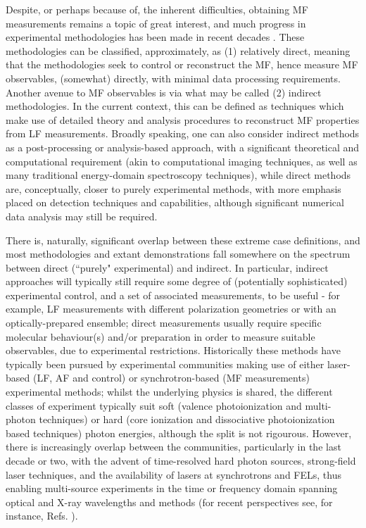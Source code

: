 \documentclass[10pt]{article}
\begin{document}
Despite, or perhaps because of, the inherent difficulties, obtaining  MF measurements remains a topic of great interest, and much progress in experimental methodologies has been made in recent decades \cite{Becker1998,Reid2003,Reid2012,kleinpoppen2013perfect,Yagishita2015,hockett2018QMP1}. %
These methodologies can be classified, approximately, as (1) relatively direct, meaning that the methodologies seek to control or reconstruct the MF, hence measure MF observables, (somewhat) directly, with minimal data processing requirements. Another avenue to MF observables is via what may be called (2) indirect methodologies. In the current context, this can be defined as techniques which make use of detailed theory and analysis procedures to reconstruct MF properties from LF measurements. Broadly speaking, one can also consider indirect methods as a post-processing or analysis-based approach, with a significant theoretical and computational requirement (akin to computational imaging techniques, as well as many traditional energy-domain spectroscopy techniques), while direct methods are, conceptually, closer to purely experimental methods, with more emphasis placed on detection techniques and capabilities, although significant numerical data analysis may still be required. 

There is, naturally, significant overlap between these extreme case definitions, and most methodologies and extant demonstrations fall somewhere on the spectrum between direct (``purely" experimental) and indirect. In particular, indirect approaches will typically still require some degree of (potentially sophisticated) experimental control, and a set of associated measurements, to be useful - for example, LF measurements with different polarization geometries or with an optically-prepared ensemble; direct measurements usually require specific molecular behaviour(s) and/or preparation in order to measure suitable observables, due to experimental restrictions. Historically these methods have typically been pursued by experimental communities making use of either laser-based (LF, AF and control) or synchrotron-based (MF measurements) experimental methods; whilst the underlying physics is shared, the different classes of experiment typically suit soft (valence photoionization and multi-photon techniques) or hard (core ionization and dissociative photoionization based techniques) photon energies, although the split is not rigourous. However, there is increasingly overlap between the communities, particularly in the last decade or two, with the advent of time-resolved hard photon sources, strong-field laser techniques, and the availability of lasers at synchrotrons and FELs, thus enabling multi-source experiments in the time or frequency domain spanning optical and X-ray wavelengths and methods (for recent perspectives see, for instance, Refs. \cite{Young2018,ueda2019RoadmapPhotonicElectronic}).
\end{document}
